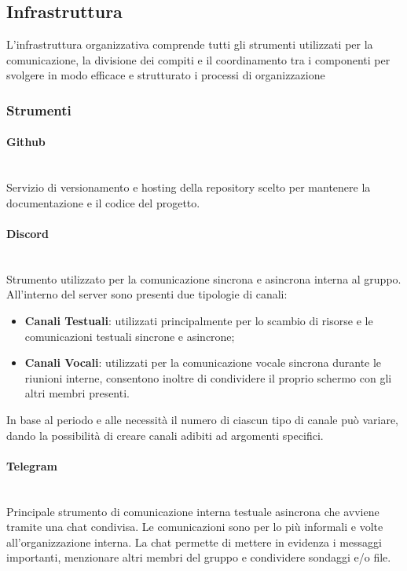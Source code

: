 \documentclass{article}
\begin{document}
\subsection{Infrastruttura}
L'infrastruttura organizzativa comprende tutti gli strumenti utilizzati per la comunicazione, la divisione dei compiti e il coordinamento tra i componenti per svolgere in modo efficace e strutturato i processi di organizzazione

\subsubsection{Strumenti}

\paragraph{Github}~\\
Servizio di versionamento e hosting della repository scelto per mantenere la documentazione e il codice del progetto.

\paragraph{Discord}~\\
Strumento utilizzato per la comunicazione sincrona e asincrona interna al gruppo. All'interno del server sono presenti due tipologie di canali:
\begin{itemize}
    \item\textbf{Canali Testuali}: utilizzati principalmente per lo scambio di risorse e le comunicazioni testuali sincrone e asincrone;
    \item\textbf{Canali Vocali}: utilizzati per la comunicazione vocale sincrona durante le riunioni interne, consentono inoltre di condividere il proprio schermo con gli altri membri presenti.
\end{itemize}

In base al periodo e alle necessità il numero di ciascun tipo di canale può variare, dando la possibilità di creare canali adibiti ad argomenti specifici.

\paragraph{Telegram}~\\
Principale strumento di comunicazione interna testuale asincrona che avviene tramite una chat condivisa. Le comunicazioni sono per lo più informali e volte all'organizzazione interna. La chat permette di mettere in evidenza i messaggi importanti, menzionare altri membri del gruppo e condividere sondaggi e/o file.
\end{document}
